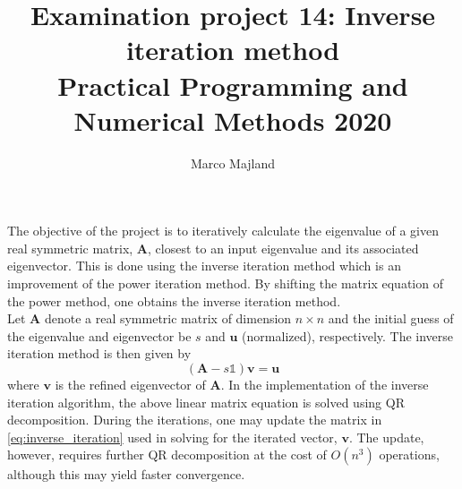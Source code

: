 \documentclass{article}
\title{Examination project 14: Inverse iteration method\\ \small Practical Programming and Numerical Methods 2020}
\author{Marco Majland}
\begin{document}
	\maketitle
	\noindent
	The objective of the project is to iteratively calculate the eigenvalue of a given real symmetric matrix, $\mathbf{A}$, closest to an input eigenvalue and its associated eigenvector. This is done using the inverse iteration method which is an improvement of the power iteration method. By shifting the matrix equation of the power method, one obtains the inverse iteration method.\\
	Let $\mathbf{A}$ denote a real  symmetric matrix of dimension $n\times n$ and the initial guess of the eigenvalue and eigenvector be $s$ and $\mathbf{u}$ (normalized), respectively. The inverse iteration method is then given by
	\begin{equation}
		(\mathbf{A} - s\mathbb{1})\mathbf{v} = \mathbf{u}
		\label{eq:inverse_iteration}
	\end{equation}
	where $\mathbf{v}$ is the refined eigenvector of $\mathbf{A}$. In the implementation of the inverse iteration algorithm, the above linear matrix equation is solved using QR decomposition. During the iterations, one may update the matrix in \ref{eq:inverse_iteration} used in solving for the iterated vector, $\mathbf{v}$. The update, however, requires further QR decomposition at the cost of $O(n^3)$ operations, although this may yield faster convergence.
\end{document}
